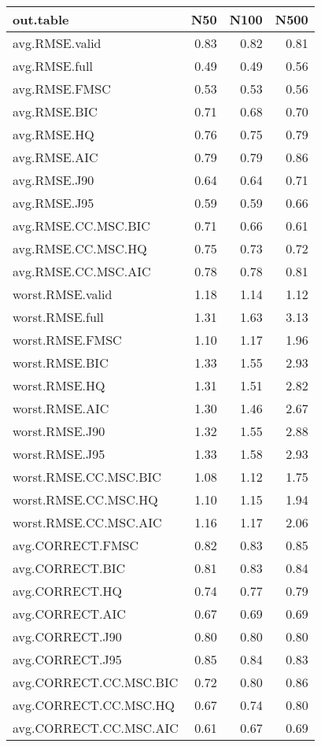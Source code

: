 %
\begin{table}[!tbp]
 \begin{center}
 \begin{tabular}{lrrr}\hline\hline
\multicolumn{1}{l}{out.table}&\multicolumn{1}{c}{N50}&\multicolumn{1}{c}{N100}&\multicolumn{1}{c}{N500}\tabularnewline
\hline
avg.RMSE.valid&0.83&0.82&0.81\tabularnewline
avg.RMSE.full&0.49&0.49&0.56\tabularnewline
avg.RMSE.FMSC&0.53&0.53&0.56\tabularnewline
avg.RMSE.BIC&0.71&0.68&0.70\tabularnewline
avg.RMSE.HQ&0.76&0.75&0.79\tabularnewline
avg.RMSE.AIC&0.79&0.79&0.86\tabularnewline
avg.RMSE.J90&0.64&0.64&0.71\tabularnewline
avg.RMSE.J95&0.59&0.59&0.66\tabularnewline
avg.RMSE.CC.MSC.BIC&0.71&0.66&0.61\tabularnewline
avg.RMSE.CC.MSC.HQ&0.75&0.73&0.72\tabularnewline
avg.RMSE.CC.MSC.AIC&0.78&0.78&0.81\tabularnewline
worst.RMSE.valid&1.18&1.14&1.12\tabularnewline
worst.RMSE.full&1.31&1.63&3.13\tabularnewline
worst.RMSE.FMSC&1.10&1.17&1.96\tabularnewline
worst.RMSE.BIC&1.33&1.55&2.93\tabularnewline
worst.RMSE.HQ&1.31&1.51&2.82\tabularnewline
worst.RMSE.AIC&1.30&1.46&2.67\tabularnewline
worst.RMSE.J90&1.32&1.55&2.88\tabularnewline
worst.RMSE.J95&1.33&1.58&2.93\tabularnewline
worst.RMSE.CC.MSC.BIC&1.08&1.12&1.75\tabularnewline
worst.RMSE.CC.MSC.HQ&1.10&1.15&1.94\tabularnewline
worst.RMSE.CC.MSC.AIC&1.16&1.17&2.06\tabularnewline
avg.CORRECT.FMSC&0.82&0.83&0.85\tabularnewline
avg.CORRECT.BIC&0.81&0.83&0.84\tabularnewline
avg.CORRECT.HQ&0.74&0.77&0.79\tabularnewline
avg.CORRECT.AIC&0.67&0.69&0.69\tabularnewline
avg.CORRECT.J90&0.80&0.80&0.80\tabularnewline
avg.CORRECT.J95&0.85&0.84&0.83\tabularnewline
avg.CORRECT.CC.MSC.BIC&0.72&0.80&0.86\tabularnewline
avg.CORRECT.CC.MSC.HQ&0.67&0.74&0.80\tabularnewline
avg.CORRECT.CC.MSC.AIC&0.61&0.67&0.69\tabularnewline
\hline
\end{tabular}

\end{center}

\end{table}

